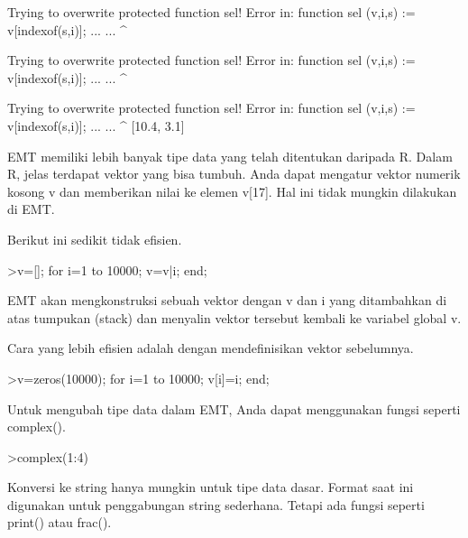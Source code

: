 \documentclass[a4paper,10pt]{article}
\begin{document}
\begin{eulernotebook}
\begin{eulercomment}
\begin{eulercomment}
\begin{eulercomment}
\begin{eulercomment}
\begin{euleroutput}
  Trying to overwrite protected function sel!
  Error in:
  function sel (v,i,s) := v[indexof(s,i)]; ... ...
               ^
  
  Trying to overwrite protected function sel!
  Error in:
  function sel (v,i,s) := v[indexof(s,i)]; ... ...
               ^
  
  Trying to overwrite protected function sel!
  Error in:
  function sel (v,i,s) := v[indexof(s,i)]; ... ...
               ^
  [10.4,  3.1]
\end{euleroutput}
\begin{eulercomment}
EMT memiliki lebih banyak tipe data yang telah ditentukan daripada R.
Dalam R, jelas terdapat vektor yang bisa tumbuh. Anda dapat mengatur
vektor numerik kosong v dan memberikan nilai ke elemen v[17]. Hal ini
tidak mungkin dilakukan di EMT.

Berikut ini sedikit tidak efisien.
\end{eulercomment}
\begin{eulerprompt}
>v=[]; for i=1 to 10000; v=v|i; end;
\end{eulerprompt}
\begin{eulercomment}
EMT akan mengkonstruksi sebuah vektor dengan v dan i yang ditambahkan
di atas tumpukan (stack) dan menyalin vektor tersebut kembali ke
variabel global v.

Cara yang lebih efisien adalah dengan mendefinisikan vektor
sebelumnya.
\end{eulercomment}
\begin{eulerprompt}
>v=zeros(10000); for i=1 to 10000; v[i]=i; end;
\end{eulerprompt}
\begin{eulercomment}
Untuk mengubah tipe data dalam EMT, Anda dapat menggunakan fungsi
seperti complex().
\end{eulercomment}
\begin{eulerprompt}
>complex(1:4)
\end{eulerprompt}
\begin{euleroutput}
  [ 1+0i ,  2+0i ,  3+0i ,  4+0i  ]
\end{euleroutput}
\begin{eulercomment}
Konversi ke string hanya mungkin untuk tipe data dasar. Format saat
ini digunakan untuk penggabungan string sederhana. Tetapi ada fungsi
seperti print() atau frac().


\end{eulercomment}
\end{eulercomment}
\end{eulercomment}
\end{eulercomment}
\end{eulercomment}
\end{eulernotebook}
\end{document}
